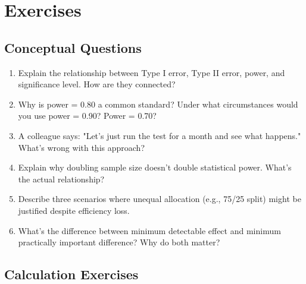 \section{Exercises}

\subsection{Conceptual Questions}

\begin{enumerate}
    \item Explain the relationship between Type I error, Type II error, power, and significance level. How are they connected?

    \item Why is power = 0.80 a common standard? Under what circumstances would you use power = 0.90? Power = 0.70?

    \item A colleague says: "Let's just run the test for a month and see what happens." What's wrong with this approach?

    \item Explain why doubling sample size doesn't double statistical power. What's the actual relationship?

    \item Describe three scenarios where unequal allocation (e.g., 75/25 split) might be justified despite efficiency loss.

    \item What's the difference between minimum detectable effect and minimum practically important difference? Why do both matter?
\end{enumerate}

\subsection{Calculation Exercises}

